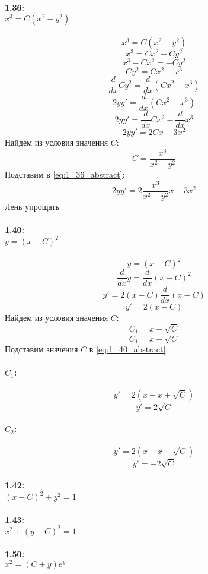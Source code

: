 \paragraph{1.36:\\ $x^3 = C(x^2 - y^2)$}
\[x^3 = C(x^2 - y^2)\]
\[x^3 = Cx^2 - Cy^2\]
\[x^3 - Cx^2 = - Cy^2\]
\[Cy^2 = Cx^2 -x^3\]
\[\frac{d}{dx}Cy^2 = \frac{d}{dx}(Cx^2 -x^3)\]
\[2yy' = \frac{d}{dx}(Cx^2 -x^3)\]
\[2yy' = \frac{d}{dx}Cx^2 -\frac{d}{dx}x^3\]
\begin{equation}
  2yy' = 2Cx - 3x^2
  \label{eq:1_36_abstract}
\end{equation}
Найдем из условия значения $C$:
\[C = \frac{x^3}{x^2 - y^2}\]
Подставим в \ref{eq:1_36_abstract}:
\[2yy' = 2\frac{x^3}{x^2 - y^2}x - 3x^2\]
Лень упрощать

\paragraph{1.40:\\ $y = (x - C)^2$}
\[y = (x - C)^2\]
\[\frac{d}{dx}y = \frac{d}{dx}(x - C)^2\]
\[y' = 2(x - C)\frac{d}{dx}(x - C)\]
\begin{equation}
  y' = 2(x - C)
  \label{eq:1_40_abstract}
\end{equation}
Найдем из условия значения $C$:
\[C_1 = x - \sqrt{C}\]
\[C_1 = x + \sqrt{C}\]
Подставим значения $C$ в \ref{eq:1_40_abstract}:
\paragraph{$C_1$:}
\[y' = 2(x - x + \sqrt{C})\]
\[y' = 2\sqrt{C}\]
\paragraph{$C_2$:}
\[y' = 2(x - x - \sqrt{C})\]
\[y' = -2\sqrt{C}\]

\paragraph{1.42:\\ $(x - C)^2 + y^2 = 1$}

\paragraph{1.43:\\ $x^2 + (y - C)^2 = 1$}

\paragraph{1.50:\\ $x^2 = (C + y)e^y$}

